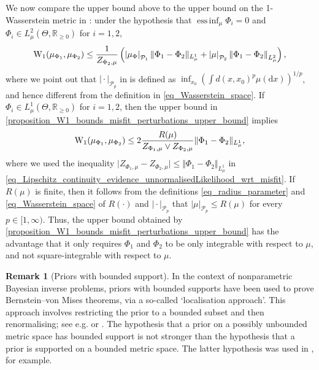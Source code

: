 \documentclass[a4paper]{scrartcl}
\theoremstyle{definition}
\newtheorem{remark}[theorem]{Remark}
\numberwithin{equation}{section}
\newcommand{\R}{\mathbb{R}}
\newcommand{\rd}{\mathrm{d}}
\DeclareMathOperator*{\essinf}{ess\,inf}
\newcommand{\abs}[1]{\vert #1\vert}
\newcommand{\Abs}[1]{\left\vert#1\right\vert}
\newcommand{\norm}[1]{\Vert #1 \Vert}
\newcommand{\Norm}[1]{\left\Vert #1 \right\Vert}
\newcommand{\Was}[0]{\textup{W}}
\begin{document}
We now compare the upper bound above to the upper bound on the 1-Wasserstein metric in \cite[Theorem 14]{Sprungk2020}: under the hypothesis that $\essinf_\mu\Phi_i=0$ and $\Phi_i\in L^2_\mu(\Theta,\R_{\geq 0})$ for $i=1,2$,
\begin{equation*}
 \Was_1(\mu_{\Phi_1},\mu_{\Phi_2})\leq\frac{1}{Z_{\Phi_2,\mu}} \left(\Abs{\mu_{\Phi}}_{\mathcal{P}_1}\norm{\Phi_1-\Phi_2}_{L^1_\mu}+\Abs{\mu}_{\mathcal{P}_2}\Norm{\Phi_1-\Phi_2}_{L^2_\mu}\right),
\end{equation*}
where we point out that $\abs{\cdot}_{\mathcal{P}_p}$ in \cite[p. 15]{Sprungk2020} is defined as $\inf_{x_0}\left(\int d(x,x_0)^p\mu(\rd x)\right)^{1/p}$, and hence different from the definition in \eqref{eq_Wasserstein_space}.
If $\Phi_i\in L^1_\mu(\Theta,\R_{\geq 0})$ for $i=1,2$, then the upper bound in \cref{proposition_W1_bounds_misfit_perturbations_upper_bound} implies 
  \begin{equation*}
   \Was_1(\mu_{\Phi_1},\mu_{\Phi_2})\leq 2\frac{R(\mu)}{Z_{\Phi_1,\mu}\vee Z_{\Phi_2,\mu}}\norm{\Phi_1-\Phi_2}_{L^1_\mu},
 \end{equation*}
where we used the inequality $\abs{Z_{\Phi_1,\mu}-Z_{\Phi_2,\mu}}\leq \norm{\Phi_1-\Phi_2}_{L^1_\mu}$ in \eqref{eq_Lipschitz_continuity_evidence_unnormalisedLikelihood_wrt_misfit}. 
If $R(\mu)$ is finite, then it follows from the definitions \eqref{eq_radius_parameter} and \eqref{eq_Wasserstein_space} of $R(\cdot)$ and $\abs{\cdot}_{\mathcal{P}_p}$ that $\abs{\mu}_{\mathcal{P}_p}\leq R(\mu)$ for every $p\in [1,\infty)$.
Thus, the upper bound obtained by \cref{proposition_W1_bounds_misfit_perturbations_upper_bound} has the advantage that it only requires $\Phi_1$ and $\Phi_2$ to be only integrable with respect to $\mu$, and not square-integrable with respect to $\mu$.

\begin{remark}[Priors with bounded support]
\label{remark_priors_with_bounded_support}
In the context of nonparametric Bayesian inverse problems, priors with bounded supports have been used to prove Bernstein--von Mises theorems, via a so-called `localisation approach'.
This approach involves restricting the prior to a bounded subset and then renormalising; see e.g. \cite[Section 4.1]{Monard2021} or \cite[Section 4.1.1.1]{Nickl2023}.
The hypothesis that a prior on a possibly unbounded metric space has bounded support is not stronger than the hypothesis that a prior is supported on a bounded metric space.
The latter hypothesis was used in \cite[Theorem 15]{Sprungk2020}, for example.
\end{remark}
\end{document}
